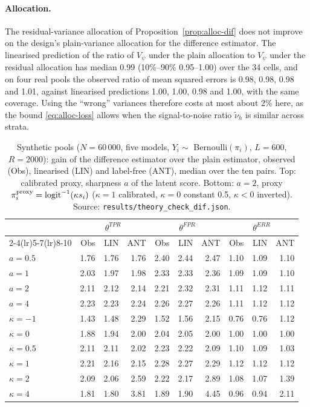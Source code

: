 \paragraph{Allocation.} The residual-variance allocation of Proposition~\ref{prop:alloc-dif} does not improve on the design's plain-variance allocation for the difference estimator. The linearised prediction of the ratio of $V_\psi$ under the plain allocation to $V_\psi$ under the residual allocation has median 0.99
(10\%--90\% 0.95--1.00) over the 34 cells, and on four real pools the observed ratio of mean squared errors is 0.98, 0.98, 0.98 and 1.01, against linearised predictions 1.00, 1.00, 0.98 and 1.00, with the same coverage. Using the ``wrong'' variances therefore costs at most about 2\% here, as the bound \eqref{eq:alloc-loss} allows when the signal-to-noise ratio $\tilde\nu_h$ is similar across strata.

\begin{table}[t]
\centering
\caption{Synthetic pools ($N=60\,000$, five models, $Y_i\sim$ Bernoulli$(\pi_i)$, $L=600$, $R=2000$): gain of the difference estimator over the plain estimator, observed (Obs), linearised (LIN) and label-free (ANT), median over the ten pairs. Top: calibrated proxy,
sharpness $a$ of the latent score. Bottom: $a=2$, proxy $\pi^{\rm proxy}_i=\mathrm{logit}^{-1}(\kappa s_i)$ ($\kappa=1$ calibrated, $\kappa=0$ constant 0.5, $\kappa<0$ inverted). Source: \texttt{results/theory\_check\_dif.json}.}
\label{tab:sim-dif-syn}
\setlength{\tabcolsep}{4pt}
\small
\begin{tabular}{l rrr rrr rrr}
\toprule
 & \multicolumn{3}{c}{$\theta^{TPR}$} & \multicolumn{3}{c}{$\theta^{FPR}$} & \multicolumn{3}{c}{$\theta^{ERR}$}\\
 \cmidrule(lr){2-4}\cmidrule(lr){5-7}\cmidrule(lr){8-10}
 & Obs & LIN & ANT & Obs & LIN & ANT & Obs & LIN & ANT\\
\midrule
$a=0.5$ & 1.76 & 1.76 & 1.76 & 2.40 & 2.44 & 2.47 & 1.10 & 1.09 & 1.10 \\
$a=1$ & 2.03 & 1.97 & 1.98 & 2.33 & 2.33 & 2.36 & 1.09 & 1.09 & 1.10 \\
$a=2$ & 2.11 & 2.12 & 2.14 & 2.21 & 2.32 & 2.31 & 1.11 & 1.12 & 1.11 \\
$a=4$ & 2.23 & 2.23 & 2.24 & 2.26 & 2.27 & 2.26 & 1.11 & 1.12 & 1.12 \\
\midrule
$\kappa=-1$ & 1.43 & 1.48 & 2.29 & 1.52 & 1.56 & 2.15 & 0.76 & 0.76 & 1.12 \\
$\kappa=0$ & 1.88 & 1.94 & 2.00 & 2.04 & 2.05 & 2.00 & 1.00 & 1.00 & 1.00 \\
$\kappa=0.5$ & 2.11 & 2.11 & 2.02 & 2.23 & 2.22 & 2.09 & 1.10 & 1.09 & 1.03 \\
$\kappa=1$ & 2.21 & 2.16 & 2.15 & 2.28 & 2.27 & 2.29 & 1.12 & 1.12 & 1.12 \\
$\kappa=2$ & 2.09 & 2.06 & 2.59 & 2.22 & 2.17 & 2.89 & 1.08 & 1.07 & 1.39 \\
$\kappa=4$ & 1.81 & 1.80 & 3.81 & 1.89 & 1.90 & 4.45 & 0.96 & 0.94 & 2.11 \\
\bottomrule
\end{tabular}
\end{table}

